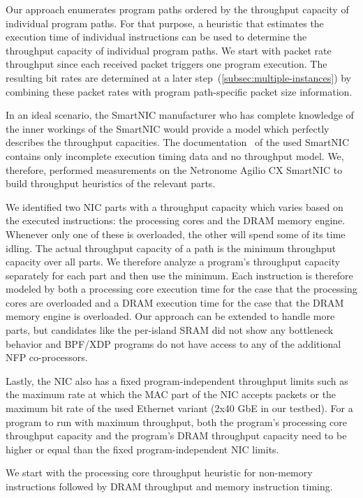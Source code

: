 \documentclass[sigconf,screen,authordraft]{acmart}
\begin{document}
Our approach enumerates program paths ordered by the throughput capacity of individual program paths.
For that purpose, a heuristic that estimates the execution time of individual instructions can be used to determine the throughput capacity of individual program paths.
We start with packet rate throughput since each received packet triggers one program execution.
The resulting bit rates are determined at a later step~(\ref{subsec:multiple-instances}) by combining these packet rates with program path-specific packet size information.

In an ideal scenario, the SmartNIC manufacturer who has complete knowledge of the inner workings of the SmartNIC would provide a model which perfectly describes the throughput capacities.
The documentation~\cite{reference-manual,joy-of-micro-c} of the used SmartNIC contains only incomplete execution timing data and no throughput model.
We, therefore, performed measurements on the Netronome Agilio CX SmartNIC to build throughput heuristics of the relevant parts.

We identified two NIC parts with a throughput capacity which varies based on the executed instructions: the processing cores and the DRAM memory engine.
Whenever only one of these is overloaded, the other will spend some of its time idling.
The actual throughput capacity of a path is the minimum throughput capacity over all parts.
We therefore analyze a program's throughput capacity separately for each part and then use the minimum.
Each instruction is therefore modeled by both a processing core execution time for the case that the processing cores are overloaded and a DRAM execution time for the case that the DRAM memory engine is overloaded.
Our approach can be extended to handle more parts, but candidates like the per-island SRAM did not show any bottleneck behavior and BPF/XDP programs do not have access to any of the additional NFP co-processors.

Lastly, the NIC also has a fixed program-independent throughput limits such as the maximum rate at which the MAC part of the NIC accepts packets or the maximum bit rate of the used Ethernet variant (2x40 GbE in our testbed).
For a program to run with maximum throughput, both the program's processing core throughput capacity and the program's DRAM throughput capacity need to be higher or equal than the fixed program-independent NIC limits.

We start with the processing core throughput heuristic for non-memory instructions followed by DRAM throughput and memory instruction timing.
\end{document}
